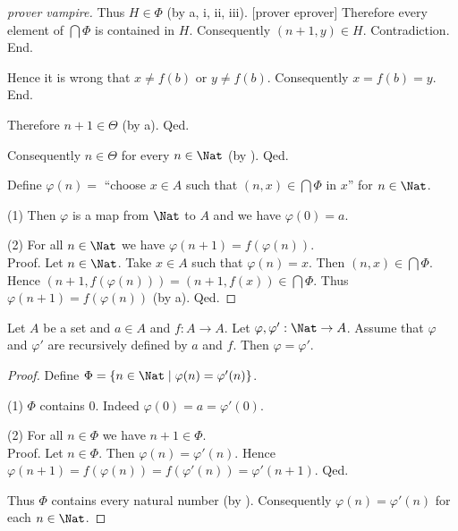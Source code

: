 \documentclass{article}
\begin{document}
\begin{forthel}
\begin{proof}
              [prover vampire]
              Thus $H \in \Phi$ (by a, i, ii, iii).
              [prover eprover]
              Therefore every element of $\bigcap \Phi$ is contained in $H$.
              Consequently $(n + 1,y) \in H$.
              Contradiction.
            End.

            Hence it is wrong that $x \neq f(b)$ or $y \neq f(b)$.
            Consequently $x = f(b) = y$.
          End.

          Therefore $n + 1 \in \Theta$ (by a).
        Qed.

        Consequently $n \in \Theta$ for every $n \in \Nat$ (by ).
      Qed.

      Define $\varphi(n) =$ ``choose $x \in A$ such that $(n, x) \in
      \bigcap \Phi$ in $x$'' for $n \in \Nat$.

      (1) Then $\varphi$ is a map from $\Nat$ to $A$ and we have
      $\varphi(0) = a$.

      (2) For all $n \in \Nat$ we have $\varphi(n + 1) =
      f(\varphi(n))$. \\
      Proof.
        Let $n \in \Nat$.
        Take $x \in A$ such that $\varphi(n) = x$.
        Then $(n, x) \in \bigcap \Phi$.
        Hence $(n + 1, f(\varphi(n))) = (n + 1, f(x)) \in \bigcap \Phi$.
        Thus $\varphi(n + 1) = f(\varphi(n))$ (by a).
      Qed.
    \end{proof}
  \end{forthel}

  \begin{forthel}
    \begin{theorem*}[title=Dedekind's Recursion Theorem: Uniqueness,id=dedekind_uniqueness]
      Let $A$ be a set and $a \in A$ and $f : A \to A$.
      Let $\varphi, \varphi' : \Nat \to A$.
      Assume that $\varphi$ and $\varphi'$ are recursively defined by $a$ and
      $f$.
      Then $\varphi = \varphi'$.
    \end{theorem*}
    \begin{proof}
      Define $\Phi = \{ n \in \Nat \mid \varphi(n) = \varphi'(n) \}$.

      (1) $\Phi$ contains $0$.
      Indeed $\varphi(0) = a = \varphi'(0)$.

      (2) For all $n \in \Phi$ we have $n + 1 \in \Phi$. \\
      Proof.
        Let $n \in \Phi$.
        Then $\varphi(n) = \varphi'(n)$.
        Hence $\varphi(n + 1)
          = f(\varphi(n))
          = f(\varphi'(n))
          = \varphi'(n + 1)$.
      Qed.

      Thus $\Phi$ contains every natural number (by ).
      Consequently $\varphi(n) = \varphi'(n)$ for each $n \in \Nat$.
    \end{proof}
  \end{forthel}

  \printbibliography
\end{document}
